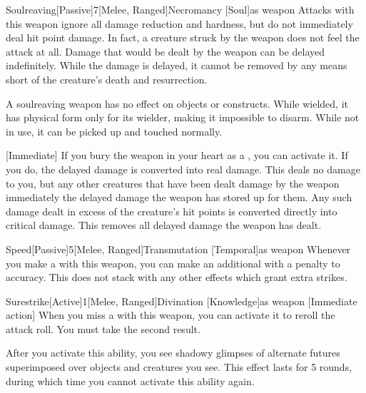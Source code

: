         \begin{magicitemdef}{Soulreaving}[Passive]{7}[Melee, Ranged]{Necromancy [Soul]}{as weapon}
             Attacks with this weapon ignore all damage reduction and hardness, but do not immediately deal hit point damage.
            In fact, a creature struck by the weapon does not feel the attack at all.
            Damage that would be dealt by the weapon can be delayed indefinitely.
            While the damage is delayed, it cannot be removed by any means short of the creature's death and resurrection.

            A soulreaving weapon has no effect on objects or constructs.
            While wielded, it has physical form only for its wielder, making it impossible to disarm.
            While not in use, it can be picked up and touched normally.

            [Immediate] If you bury the weapon in your heart as a , you can activate it.
            If you do, the delayed damage is converted into real damage.
            This deals no damage to you, but any other creatures that have been dealt damage by the weapon immediately the delayed damage the weapon has stored up for them.
            Any such damage dealt in excess of the creature's hit points is converted directly into critical damage.
            This removes all delayed damage the weapon has dealt.
        \end{magicitemdef}

        \begin{magicitemdef}{Speed}[Passive]{5}[Melee, Ranged]{Transmutation [Temporal]}{as weapon}
             Whenever you make a  with this weapon, you can make an additional  with a  penalty to accuracy.
            This does not stack with any other effects which grant extra strikes.
        \end{magicitemdef}

        \begin{magicitemdef}{Surestrike}[Active]{1}[Melee, Ranged]{Divination [Knowledge]}{as weapon}
            [Immediate action] When you miss a  with this weapon, you can activate it to reroll the attack roll.
            You must take the second result.

            After you activate this ability, you see shadowy glimpses of alternate futures superimposed over objects and creatures you see.
            This effect lasts for 5 rounds, during which time you cannot activate this ability again.
        \end{magicitemdef}

